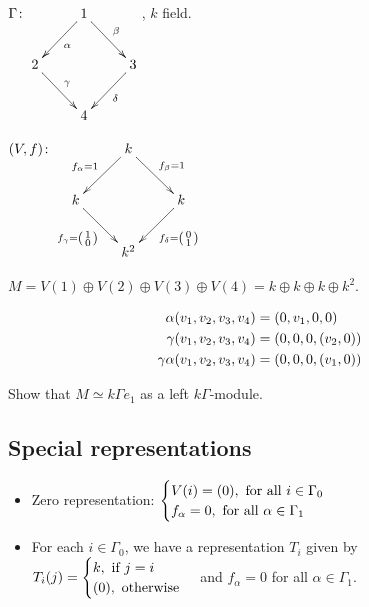 \begin{exam}
$\Gamma\colon \xymatrix{ & 1\ar[dl]^\alpha\ar[dr]^\beta & \\
2\ar[dr]^\gamma & & 3\ar[dl]^\delta\\
& 4 & }$, $k$ field.

$(V,f)\colon \xymatrix{ & k\ar[dl]_{f_\alpha = 1}\ar[dr]^{f_\beta=1} & \\
k\ar[dr]_{f_\gamma=\left(\begin{smallmatrix} 1\\ 0\end{smallmatrix}\right)} & & k\ar[dl]^{f_\delta=\left(\begin{smallmatrix} 0\\ 1\end{smallmatrix}\right)}\\
& k^2 & }$

$M = V(1) \oplus V(2) \oplus V(3) \oplus V(4) = k\oplus k\oplus
k\oplus k^2$.

\begin{align}
\alpha (v_1,v_2,v_3,v_4)  & = (0, v_1, 0, 0 )\notag\\
\gamma (v_1,v_2,v_3,v_4)  & = (0, 0, 0, (v_2, 0) )\notag\\
\gamma\alpha (v_1,v_2,v_3,v_4)  & = (0, 0, 0, (v_1, 0) )\notag
\end{align}

\begin{exer} Show that $M\simeq k\Gamma e_1$ as a left
  $k\Gamma$-module.
\end{exer}

\subsection{Special representations}
\begin{itemize}
\item Zero representation:  
$\begin{cases} 
V(i) = (0), \text{\ for all $i\in\Gamma_0$}\notag\\
f_\alpha = 0, \text{\ for all $\alpha\in \Gamma_1$}\notag
\end{cases}$
\item For each $i\in\Gamma_0$, we have a representation $T_i$ given by
$T_i(j) = \begin{cases} k, \text{\ if $j = i$}\notag\\
(0), \text{\ otherwise}\notag
\end{cases}$
and $f_\alpha = 0$ for all $\alpha\in \Gamma_1$. 


\end{itemize}
\end{exam}
